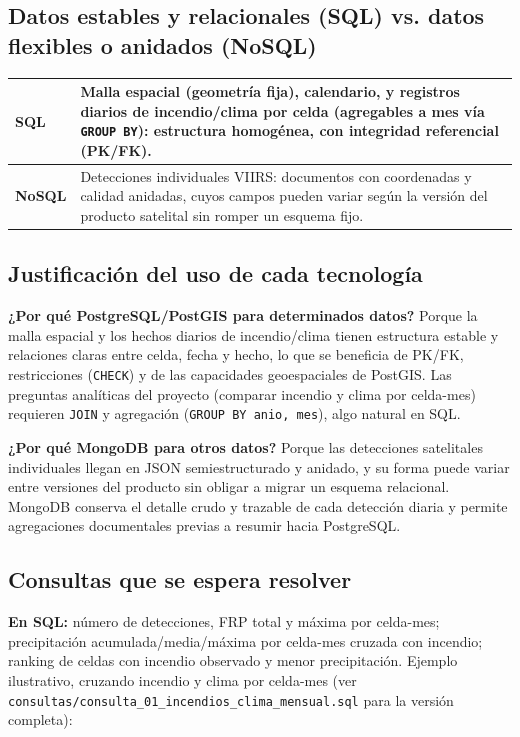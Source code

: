 \documentclass[11pt,a4paper]{article}
\begin{document}
\subsection{Datos estables y relacionales (SQL) vs. datos flexibles o anidados (NoSQL)}

\begin{tabularx}{\textwidth}{@{}lX@{}}
\toprule
\textbf{SQL} & Malla espacial (geometr\'ia fija), calendario, y registros diarios de incendio/clima por celda (agregables a mes v\'ia \texttt{GROUP BY}): estructura homog\'enea, con integridad referencial (PK/FK). \\
\midrule
\textbf{NoSQL} & Detecciones individuales VIIRS: documentos con coordenadas y calidad anidadas, cuyos campos pueden variar seg\'un la versi\'on del producto satelital sin romper un esquema fijo. \\
\bottomrule
\end{tabularx}

\subsection{Justificaci\'on del uso de cada tecnolog\'ia}

\textbf{¿Por qu\'e PostgreSQL/PostGIS para determinados datos?} Porque la malla espacial y los hechos diarios de incendio/clima tienen estructura estable y relaciones claras entre celda, fecha y hecho, lo que se beneficia de PK/FK, restricciones (\texttt{CHECK}) y de las capacidades geoespaciales de PostGIS. Las preguntas anal\'iticas del proyecto (comparar incendio y clima por celda-mes) requieren \texttt{JOIN} y agregaci\'on (\texttt{GROUP BY anio, mes}), algo natural en SQL.

\textbf{¿Por qu\'e MongoDB para otros datos?} Porque las detecciones satelitales individuales llegan en JSON semiestructurado y anidado, y su forma puede variar entre versiones del producto sin obligar a migrar un esquema relacional. MongoDB conserva el detalle crudo y trazable de cada detecci\'on diaria y permite agregaciones documentales previas a resumir hacia PostgreSQL.

\subsection{Consultas que se espera resolver}
\textbf{En SQL:} n\'umero de detecciones, FRP total y m\'axima por celda-mes; precipitaci\'on acumulada/media/m\'axima por celda-mes cruzada con incendio; ranking de celdas con incendio observado y menor precipitaci\'on. Ejemplo ilustrativo, cruzando incendio y clima por celda-mes (ver \texttt{consultas/consulta\_01\_incendios\_clima\_mensual.sql} para la versi\'on completa):
\end{document}
